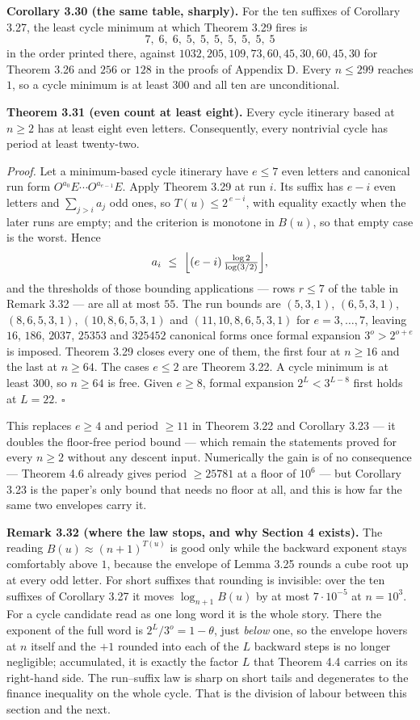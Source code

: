 \documentclass[12pt]{article}
\begin{document}
\textbf{Corollary 3.30 (the same table, sharply).} For the ten suffixes
of Corollary 3.27, the least cycle minimum at which Theorem 3.29 fires
is \[
7,\;6,\;6,\;5,\;5,\;5,\;5,\;5,\;5,\;5
\] in the order printed there, against
\(1032,205,109,73,60,45,30,60,45,30\) for Theorem 3.26 and \(256\) or
\(128\) in the proofs of Appendix D. Every \(n\le 299\) reaches \(1\),
so a cycle minimum is at least \(300\) and all ten are unconditional.

\textbf{Theorem 3.31 (even count at least eight).} Every cycle itinerary
based at \(n\ge2\) has at least eight even letters. Consequently, every
nontrivial cycle has period at least twenty-two.

\emph{Proof.} Let a minimum-based cycle itinerary have \(e\le 7\) even
letters and canonical run form \(O^{a_0}E\cdots O^{a_{e-1}}E\). Apply
Theorem 3.29 at run \(i\). Its suffix has \(e-i\) even letters and
\(\sum_{j>i}a_j\) odd ones, so \(T(u)\le 2^{\,e-i}\), with equality
exactly when the later runs are empty; and the criterion is monotone in
\(B(u)\), so that empty case is the worst. Hence \[
a_i\ \le\ \Bigl\lfloor (e-i)\,\tfrac{\log 2}{\log(3/2)}\Bigr\rfloor,
\] and the thresholds of those bounding applications --- rows \(r\le 7\)
of the table in Remark 3.32 --- are all at most \(55\). The run bounds
are \((5,3,1)\), \((6,5,3,1)\), \((8,6,5,3,1)\), \((10,8,6,5,3,1)\) and
\((11,10,8,6,5,3,1)\) for \(e=3,\dots,7\), leaving \(16\), \(186\),
\(2037\), \(25353\) and \(325452\) canonical forms once formal expansion
\(3^{o}>2^{o+e}\) is imposed. Theorem 3.29 closes every one of them, the
first four at \(n\ge16\) and the last at \(n\ge64\). The cases \(e\le2\)
are Theorem 3.22. A cycle minimum is at least \(300\), so \(n\ge64\) is
free. Given \(e\ge8\), formal expansion \(2^{L}<3^{L-8}\) first holds at
\(L=22\). \(\square\)

This replaces \(e\ge4\) and period \(\ge11\) in Theorem 3.22 and
Corollary 3.23 --- it doubles the floor-free period bound --- which
remain the statements proved for every \(n\ge2\) without any descent
input. Numerically the gain is of no consequence --- Theorem 4.6 already
gives period \(\ge25781\) at a floor of \(10^{6}\) --- but Corollary
3.23 is the paper's only bound that needs no floor at all, and this is
how far the same two envelopes carry it.

\textbf{Remark 3.32 (where the law stops, and why Section 4 exists).}
The reading \(B(u)\approx(n+1)^{T(u)}\) is good only while the backward
exponent stays comfortably above \(1\), because the envelope of Lemma
3.25 rounds a cube root up at every odd letter. For short suffixes that
rounding is invisible: over the ten suffixes of Corollary 3.27 it moves
\(\log_{n+1}B(u)\) by at most \(7\cdot10^{-5}\) at \(n=10^{3}\). For a
cycle candidate read as one long word it is the whole story. There the
exponent of the full word is \(2^{L}/3^{o}=1-\theta\), just \emph{below}
one, so the envelope hovers at \(n\) itself and the \(+1\) rounded into
each of the \(L\) backward steps is no longer negligible; accumulated,
it is exactly the factor \(L\) that Theorem 4.4 carries on its
right-hand side. The run--suffix law is sharp on short tails and
degenerates to the finance inequality on the whole cycle. That is the
division of labour between this section and the next.
\end{document}
